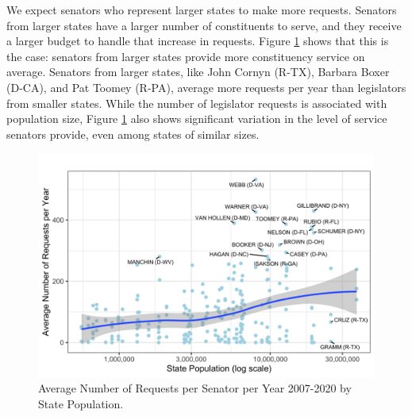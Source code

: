 \documentclass[12pt]{article}
\begin{document}
We expect senators who represent larger states to make more requests. Senators from larger states have a larger number of constituents to serve, and they receive a larger budget to handle that increase in requests.
Figure \ref{f:stateSize} shows that this is the case: senators from larger states provide more constituency service on average. Senators from larger states, like John Cornyn (R-TX), Barbara Boxer (D-CA), and Pat Toomey (R-PA), average more requests per year than legislators from smaller states. While the number of legislator requests is associated with population size, Figure \ref{f:stateSize} also shows significant variation in the level of service senators provide, even among states of similar sizes.  

\begin{figure}
\centering
\caption{Average Number of Requests per Senator per Year 2007-2020 by State Population.} \label{f:stateSize}
\includegraphics[width = \textwidth]{figs/pop-1}
\end{figure}


\end{document}
